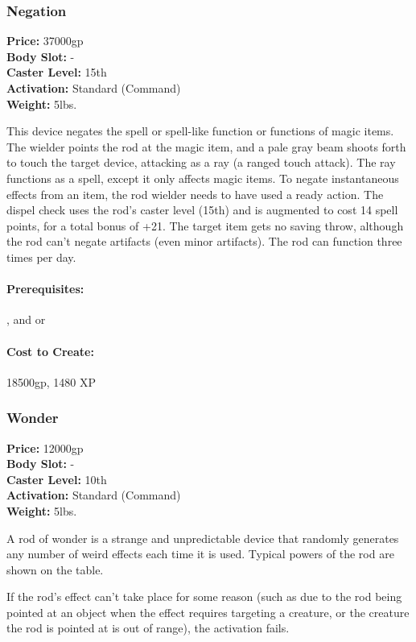\subsubsection{Negation}
\textbf{Price:} 37000gp\\
\textbf{Body Slot:} -\\
\textbf{Caster Level:} 15th\\
\textbf{Activation:} Standard (Command)\\
\textbf{Weight:} 5lbs.

This device negates the spell or spell-like function or functions of magic items. 
The wielder points the rod at the magic item, and a pale gray beam shoots forth to touch the target device, attacking as a ray (a ranged touch attack). 
The ray functions as a  spell, except it only affects magic items. 
To negate instantaneous effects from an item, the rod wielder needs to have used a ready action. 
The dispel check uses the rod's caster level (15th) and is augmented to cost 14 spell points, for a total bonus of +21. 
The target item gets no saving throw, although the rod can't negate artifacts (even minor artifacts). 
The rod can function three times per day.

\paragraph{Prerequisites:} , and  or 

\paragraph{Cost to Create:} 18500gp, 1480 XP
\subsubsection{Wonder}
\textbf{Price:} 12000gp\\
\textbf{Body Slot:} -\\
\textbf{Caster Level:} 10th\\
\textbf{Activation:} Standard (Command)\\
\textbf{Weight:} 5lbs.

A rod of wonder is a strange and unpredictable device that randomly generates any number of weird effects each time it is used.  Typical powers of the rod are shown on the  table.

If the rod's effect can't take place for some reason (such as due to the rod being pointed at an object when the effect requires targeting a creature, or the creature the rod is pointed at is out of range), the activation fails.

